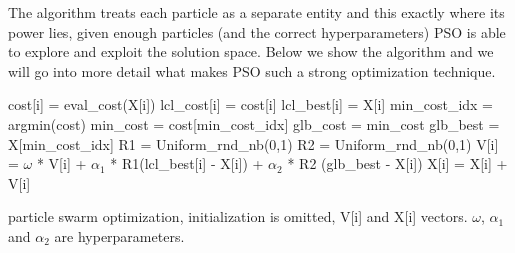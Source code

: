 \documentclass[]{article}
\begin{document}
The algorithm treats each particle as a separate entity and this exactly where its power lies, given enough particles (and the correct hyperparameters) PSO is able to explore and exploit the solution space. Below we show the algorithm and we will go into more detail what makes PSO such a strong optimization technique.\medskip

\begin{algorithm}[h]
    {    
            {
            cost[i] = eval\_cost(X[i])\;
            \BlankLine
            \BlankLine
                {
                lcl\_cost[i] = cost[i]\;
                lcl\_best[i] = X[i]\;
                }
            }
        \BlankLine
        \BlankLine
        min\_cost\_idx = argmin(cost)\;
        min\_cost = cost[min\_cost\_idx]\;
            {
            glb\_cost = min\_cost\;
            glb\_best = X[min\_cost\_idx]\;
            }
        \BlankLine
        \BlankLine
        R1 = Uniform\_rnd\_nb(0,1)\;
        R2 = Uniform\_rnd\_nb(0,1)\;
            {
            V[i] = $\omega$ * V[i] + $\alpha_1$ * R1(lcl\_best[i] - X[i]) + $\alpha_2$ * R2 (glb\_best - X[i])\;
            X[i] = X[i] + V[i]\;
            }
    }
    \caption{particle swarm optimization, initialization is omitted, V[i] and X[i] vectors. $\omega$, $\alpha_1$ and $\alpha_2$ are hyperparameters.}
\end{algorithm}\medskip
\end{document}
